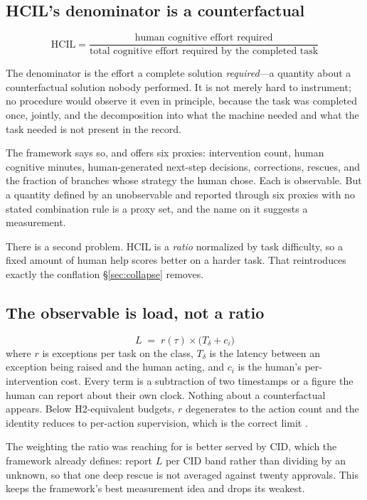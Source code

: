 \documentclass[11pt]{article}
\theoremstyle{definition}
\newcommand{\Td}{\ensuremath{T_\delta}}
\begin{document}
\subsection{HCIL's denominator is a counterfactual}

\begin{equation*}
\text{HCIL}=\frac{\text{human cognitive effort required}}{\text{total cognitive effort required by the completed task}}
\end{equation*}

The denominator is the effort a complete solution \emph{required}---a quantity about a counterfactual solution nobody performed. It is not merely hard to instrument; no procedure would observe it even in principle, because the task was completed once, jointly, and the decomposition into what the machine needed and what the task needed is not present in the record.

The framework says so, and offers six proxies: intervention count, human cognitive minutes, human-generated next-step decisions, corrections, rescues, and the fraction of branches whose strategy the human chose. Each is observable. But a quantity defined by an unobservable and reported through six proxies with no stated combination rule is a proxy set, and the name on it suggests a measurement.

There is a second problem. HCIL is a \emph{ratio} normalized by task difficulty, so a fixed amount of human help scores better on a harder task. That reintroduces exactly the conflation \S\ref{sec:collapse} removes.

\subsection{The observable is load, not a ratio}

\begin{equation}
L\;=\;r(\tau)\times\big(\Td+c_i\big)
\end{equation}
where $r$ is exceptions per task on the class, \Td{} is the latency between an exception being raised and the human acting, and $c_i$ is the human's per-intervention cost. Every term is a subtraction of two timestamps or a figure the human can report about their own clock. Nothing about a counterfactual appears. Below H2-equivalent budgets, $r$ degenerates to the action count and the identity reduces to per-action supervision, which is the correct limit \citep{amdahl1967}.

The weighting the ratio was reaching for is better served by CID, which the framework already defines: report $L$ per CID band rather than dividing by an unknown, so that one deep rescue is not averaged against twenty approvals. This keeps the framework's best measurement idea and drops its weakest.
\end{document}
